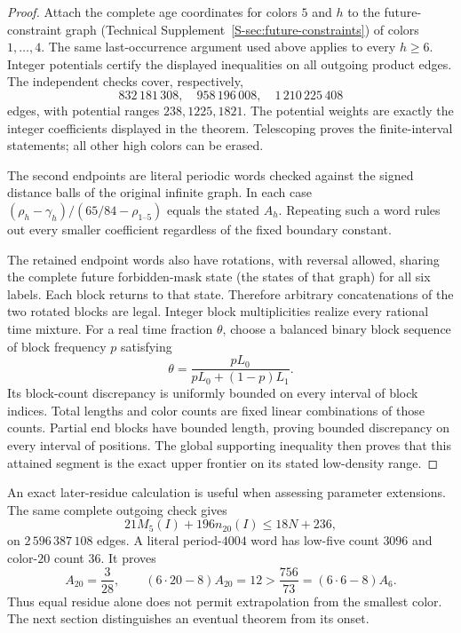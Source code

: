 \documentclass[11pt,reqno]{amsart}
\theoremstyle{plain}
\theoremstyle{plain}
\theoremstyle{plain}
\begin{document}
\begin{proof}
Attach the complete age coordinates for colors $5$ and $h$ to the
future-constraint graph (Technical Supplement~\ref*{S-sec:future-constraints}) of colors
$1,\ldots,4$. The same last-occurrence
argument used above applies to every $h\ge6$. Integer potentials certify
the displayed inequalities on all outgoing product edges. The independent
checks cover, respectively,
\[
832\,181\,308,\quad958\,196\,008,\quad1\,210\,225\,408
\]
edges, with potential ranges $238,1225,1821$. The potential weights are
exactly the integer coefficients displayed in the theorem. Telescoping
proves the finite-interval statements; all other high colors can be erased.

The second endpoints are literal periodic words checked against the
signed distance balls of the original infinite graph. In each case
$(\rho_h-\gamma_h)/(65/84-\rho_{1\text{--}5})$ equals the stated $A_h$.
Repeating such a word rules out every smaller coefficient regardless of
the fixed boundary constant.

The retained endpoint words also have rotations, with reversal allowed,
sharing the complete future forbidden-mask state (the states of that graph)
for all six labels.
Each block returns to that state. Therefore arbitrary concatenations of
the two rotated blocks are legal. Integer block multiplicities realize
every rational time mixture. For a real time fraction $\theta$, choose a
balanced binary block sequence of block frequency $p$ satisfying
\[
\theta=\frac{pL_0}{pL_0+(1-p)L_1}.
\]
Its block-count discrepancy is uniformly bounded on every interval of
block indices. Total lengths and color counts are fixed linear combinations
of those counts. Partial end blocks have bounded length, proving bounded
discrepancy on every interval of positions. The global supporting
inequality then proves that this attained segment is the exact upper
frontier on its stated low-density range.
\end{proof}

An exact later-residue calculation is useful when assessing parameter
extensions. The same complete outgoing check gives
\[
21M_5(I)+196n_{20}(I)\le18N+236,
\]
on $2\,596\,387\,108$ edges. A literal period-$4004$ word has low-five
count $3096$ and color-$20$ count $36$. It proves
\begin{equation}\label{M-eq:color20-transient}
A_{20}=\frac3{28},\qquad
(6\cdot20-8)A_{20}=12>\frac{756}{73}=(6\cdot6-8)A_6.
\end{equation}
Thus equal residue alone does not permit extrapolation from the smallest
color. The next section distinguishes an eventual theorem from its onset.
\end{document}
